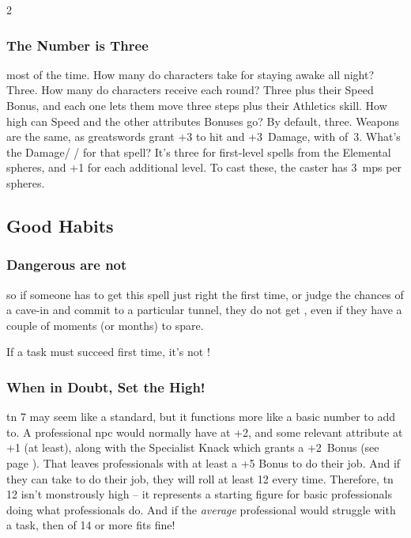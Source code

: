 \begin{multicols}{2}

\subsubsection{The Number is Three}
most of the time.
How many  do characters take for staying awake all night?
Three.
How many  do characters receive each \gls{round}?
Three plus their Speed Bonus, and each one lets them move three \glspl{step} plus their Athletics \gls{skill}.
How high can Speed and the other \glspl{attribute} Bonuses go?
By default, three.
Weapons are the same, as greatswords grant +3 to hit and +3~Damage, with  of~3.
What's the Damage/ /  for that \gls{spell}?
It's three for first-level \glspl{spell} from the Elemental \glspl{sphere}, and +1 for each additional level.
To cast these, the caster has 3~\glspl{mp} per \glspl{sphere}.

\subsection{Good Habits}

\subsubsection{Dangerous  are not }
so if someone has to get this \gls{spell} just right the first time, or judge
the chances of a cave-in and commit to a particular tunnel, they do not get 
, even if they have a couple of moments (or months) to spare.

If a task must succeed first time, it's not !

\subsubsection{When in Doubt, Set the  High!}
\Gls{tn} 7 may seem like a standard, but it functions more like a basic number to add to.
A professional \gls{npc} would normally have  at +2, and some relevant \gls{attribute} at +1 (at least), along with the Specialist Knack
which grants a +2~Bonus
(see page \pageref{specialist}).
That leaves professionals with at least a +5 Bonus to do their job.
And if they can take  to do their job, they will roll at least 12 every time.
Therefore, \gls{tn} 12 isn't monstrously high -- it represents a starting figure for basic professionals doing what professionals do.
And if the \emph{average} professional would struggle with a task, then  of 14 or more fits fine!


\end{multicols}
